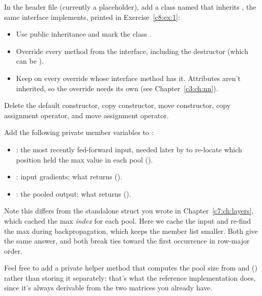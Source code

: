 \label{c9:ex:1}
In the header file  (currently a placeholder), add a class
named  that inherits , the same interface
 implements, printed in Exercise~\ref{c8:ex:1}:
\begin{itemize}
  \item Use public inheritance and mark the class .
  \item Override every method from the interface, including the destructor (which can be
    ).
  \item Keep \code{[[nodiscard]]} on every override whose interface method has it. Attributes
    aren't inherited, so the override needs its own (see Chapter~\ref{c3:ch:nn}).
\end{itemize}

\label{c9:ex:2}
Delete the default constructor, copy constructor, move constructor, copy assignment operator, and
move assignment operator.

\label{c9:ex:3}
Add the following private member variables to :
\begin{itemize}
  \item \textbf{}: the most recently fed-forward input, needed later by
     to re-locate which position held the max value in each pool
    ().
  \item \textbf{}: input gradients; what  returns
    ().
  \item \textbf{}: the pooled output; what  returns
    ().
\end{itemize}
Note this differs from the standalone  struct you wrote in
Chapter~\ref{c7:ch:layers}, which cached the max \emph{index} for each pool. Here we cache the
input and re-find the max during backpropagation, which keeps the member list smaller. Both give the
same answer, and both break ties toward the first occurrence in row-major order.

Feel free to add a private helper method that computes the pool size from  and
 () rather than storing it separately: that's
what the reference implementation does, since it's always derivable from the two matrices you
already have.

